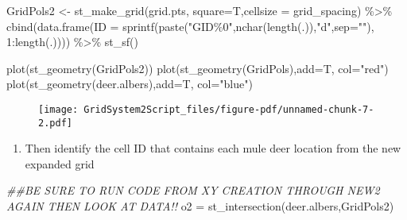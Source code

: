 \documentclass[
  letterpaper,
]{book}
\newenvironment{Shaded}{\begin{snugshade}}{\end{snugshade}}
\newcommand{\AttributeTok}[1]{\textcolor[rgb]{0.40,0.45,0.13}{#1}}
\newcommand{\DecValTok}[1]{\textcolor[rgb]{0.68,0.00,0.00}{#1}}
\newcommand{\DocumentationTok}[1]{\textcolor[rgb]{0.37,0.37,0.37}{\textit{#1}}}
\newcommand{\FunctionTok}[1]{\textcolor[rgb]{0.28,0.35,0.67}{#1}}
\newcommand{\NormalTok}[1]{\textcolor[rgb]{0.00,0.23,0.31}{#1}}
\newcommand{\OtherTok}[1]{\textcolor[rgb]{0.00,0.23,0.31}{#1}}
\newcommand{\SpecialCharTok}[1]{\textcolor[rgb]{0.37,0.37,0.37}{#1}}
\newcommand{\StringTok}[1]{\textcolor[rgb]{0.13,0.47,0.30}{#1}}
\providecommand{\tightlist}{%
  \setlength{\itemsep}{0pt}\setlength{\parskip}{0pt}}\usepackage{longtable,booktabs,array}
\begin{document}
\begin{Shaded}
\begin{Highlighting}[]
\NormalTok{GridPols2 }\OtherTok{\textless{}{-}} \FunctionTok{st\_make\_grid}\NormalTok{(grid.pts, }\AttributeTok{square=}\NormalTok{T,}\AttributeTok{cellsize =}\NormalTok{ grid\_spacing) }\SpecialCharTok{\%\textgreater{}\%}
   \FunctionTok{cbind}\NormalTok{(}\FunctionTok{data.frame}\NormalTok{(}\AttributeTok{ID =} \FunctionTok{sprintf}\NormalTok{(}\FunctionTok{paste}\NormalTok{(}\StringTok{"GID\%0"}\NormalTok{,}\FunctionTok{nchar}\NormalTok{(}\FunctionTok{length}\NormalTok{(.)),}\StringTok{"d"}\NormalTok{,}\AttributeTok{sep=}\StringTok{""}\NormalTok{), }\DecValTok{1}\SpecialCharTok{:}\FunctionTok{length}\NormalTok{(.)))) }\SpecialCharTok{\%\textgreater{}\%}
   \FunctionTok{st\_sf}\NormalTok{()}

\FunctionTok{plot}\NormalTok{(}\FunctionTok{st\_geometry}\NormalTok{(GridPols2))}
\FunctionTok{plot}\NormalTok{(}\FunctionTok{st\_geometry}\NormalTok{(GridPols),}\AttributeTok{add=}\NormalTok{T, }\AttributeTok{col=}\StringTok{"red"}\NormalTok{)}
\FunctionTok{plot}\NormalTok{(}\FunctionTok{st\_geometry}\NormalTok{(deer.albers),}\AttributeTok{add=}\NormalTok{T, }\AttributeTok{col=}\StringTok{"blue"}\NormalTok{)}
\end{Highlighting}
\end{Shaded}

\begin{figure}[H]

{\centering \texttt{[image: GridSystem2Script\_files/figure-pdf/unnamed-chunk-7-2.pdf]}

}

\end{figure}

\begin{enumerate}
\def\labelenumi{\arabic{enumi}.}
\setcounter{enumi}{8}
\tightlist
\item
  Then identify the cell ID that contains each mule deer location from
  the new expanded grid
\end{enumerate}

\begin{Shaded}
\begin{Highlighting}[]
\DocumentationTok{\#\#BE SURE TO RUN CODE FROM XY CREATION THROUGH NEW2 AGAIN THEN LOOK AT DATA!!}
\NormalTok{o2 }\OtherTok{=} \FunctionTok{st\_intersection}\NormalTok{(deer.albers,GridPols2)}
\end{Highlighting}
\end{Shaded}
\end{document}
